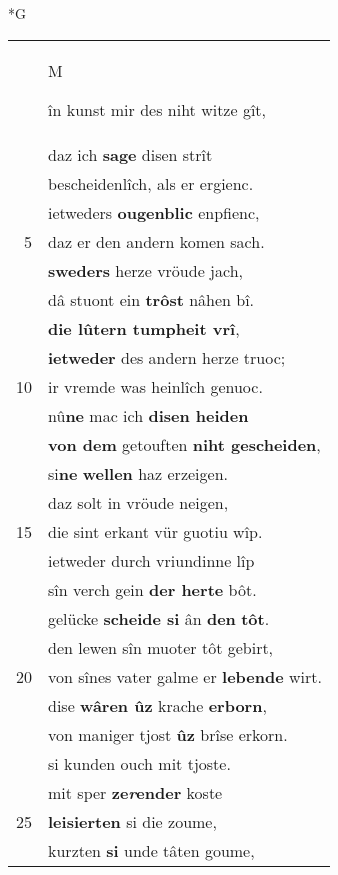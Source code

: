 \documentclass[8pt,a4paper,notitlepage]{article}
\begin{document}
\begin{table}[ht]
\begin{minipage}[t]{0.5\linewidth}
\small
\begin{center}*G
\end{center}
\begin{tabular}{rl}
 & \begin{large}M\end{large}în kunst mir des niht witze gît,\\ 
 & daz ich \textbf{sage} disen strît\\ 
 & bescheidenlîch, als er ergienc.\\ 
 & ietweders \textbf{ougenblic} enpfienc,\\ 
5 & daz er den andern komen sach.\\ 
 & \textbf{sweders} herze vröude jach,\\ 
 & dâ stuont ein \textbf{trôst} nâhen bî.\\ 
 & \textbf{die lûtern tumpheit vrî},\\ 
 & \textbf{ietweder} des andern herze truoc;\\ 
10 & ir vremde was heinlîch genuoc.\\ 
 & nû\textbf{ne} mac ich \textbf{disen heiden}\\ 
 & \textbf{von dem} getouften \textbf{niht gescheiden},\\ 
 & si\textbf{ne} \textbf{wellen} haz erzeigen.\\ 
 & daz solt in vröude neigen,\\ 
15 & die sint erkant vür guotiu wîp.\\ 
 & ietweder durch vriundinne lîp\\ 
 & sîn verch gein \textbf{der herte} bôt.\\ 
 & gelücke \textbf{scheide si} ân \textbf{den} \textbf{tôt}.\\ 
 & den lewen sîn muoter tôt gebirt,\\ 
20 & von sînes vater galme er \textbf{lebende} wirt.\\ 
 & dise \textbf{wâren ûz} krache \textbf{erborn},\\ 
 & von maniger tjost \textbf{ûz} brîse erkorn.\\ 
 & si kunden ouch mit tjoste.\\ 
 & mit sper \textbf{ze\textit{r}ender} koste\\ 
25 & \textbf{leisierten} si die zoume,\\ 
 & kurzten \textbf{si} unde tâten goume,\\ 

\end{tabular}
\end{minipage}
\end{table}
\end{document}
